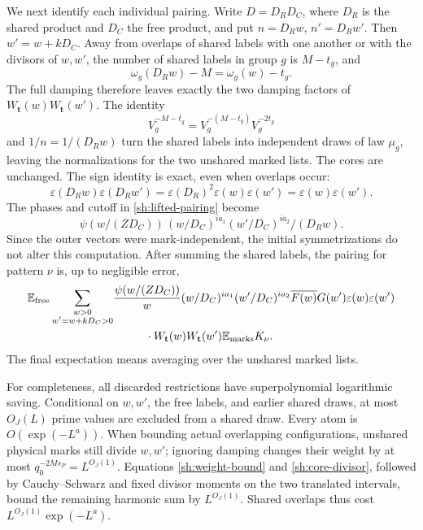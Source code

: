 We next identify each individual pairing.  Write $D=D_RD_C$,
where $D_R$ is the shared product and $D_C$ the free product, and put
$n=D_Rw$, $n'=D_Rw'$.  Then $w'=w+kD_C$.  Away from overlaps of
shared labels with one another or with the divisors of $w,w'$, the
number of shared labels in group $g$ is $M-t_g$, and
\[
 \omega_g(D_Rw)-M=\omega_g(w)-t_g.
\]
The full damping therefore leaves exactly the two damping factors
of $W_{\mathbf t}(w)W_{\mathbf t}(w')$.  The identity
\[
 V_g^{-M-t_g}=V_g^{-(M-t_g)}V_g^{-2t_g}
\]
and $1/n=1/(D_Rw)$ turn the shared labels into independent draws
of law $\mu_g$, leaving the normalizations for the two unshared
marked lists.  The cores are unchanged.  The sign identity is exact,
even when overlaps occur:
\begin{equation}\label{sh:shared-sign}
 \varepsilon(D_Rw)\varepsilon(D_Rw')
 =\varepsilon(D_R)^2\varepsilon(w)\varepsilon(w')
 =\varepsilon(w)\varepsilon(w').
\end{equation}
The phases and cutoff in \eqref{sh:lifted-pairing} become
\[
 \psi(w/(ZD_C))\,(w/D_C)^{ia_1}(w'/D_C)^{ia_2}/(D_Rw).
\]
Since the outer vectors were mark-independent, the initial
symmetrizations do not alter this computation.  After summing the
shared labels, the pairing for pattern $\nu$ is, up to negligible
error,
\begin{align}
 \mathbb E_{\rm free}\sum_{\substack{w>0\\w'=w+kD_C>0}}
 &\frac{\psi(w/(ZD_C))}{w}
 (w/D_C)^{ia_1}(w'/D_C)^{ia_2}
 \overline{F(w)}G(w')\varepsilon(w)\varepsilon(w')\notag\\
 &\hspace{10mm}\cdot W_{\mathbf t}(w)W_{\mathbf t}(w')
                   \mathbb E_{\rm marks}K_\nu.
 \label{sh:stripped}
\end{align}
The final expectation means averaging over the unshared marked lists.

For completeness, all discarded restrictions have superpolynomial
logarithmic saving.  Conditional on $w,w'$, the free labels, and
earlier shared draws, at most $O_J(L)$ prime values are excluded
from a shared draw.  Every atom is $O(\exp(-L^a))$.  When bounding
actual overlapping configurations, unshared physical marks still
divide $w,w'$; ignoring damping changes their weight by at most
$q_0^{-2Ms_P}=L^{O_J(1)}$.  Equations \eqref{sh:weight-bound} and
\eqref{sh:core-divisor}, followed by Cauchy--Schwarz and fixed divisor
moments on the two translated intervals, bound the remaining harmonic
sum by $L^{O_J(1)}$.  Shared overlaps thus cost
$L^{O_J(1)}\exp(-L^a)$.

